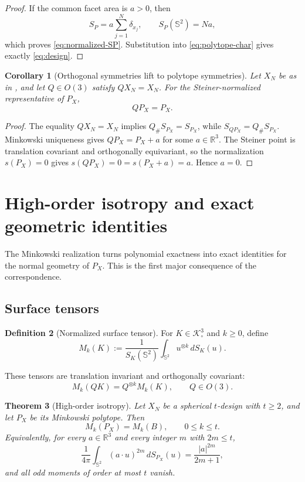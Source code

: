 \documentclass[11pt]{article}
\newtheorem{theorem}{Theorem}[section]
\newtheorem{corollary}[theorem]{Corollary}
\theoremstyle{definition}
\newtheorem{definition}[theorem]{Definition}
\theoremstyle{remark}
\newcommand{\Sph}{\mathbb S}
\newcommand{\R}{\mathbb R}
\newcommand{\K}{\mathcal K}
\begin{document}
\begin{proof}
If the common facet area is $a>0$, then
\[
S_P=a\sum_{j=1}^N\delta_{x_j},\qquad S_P(\Sph^2)=Na,
\]
which proves \eqref{eq:normalized-SP}. Substitution into \eqref{eq:polytope-char} gives exactly \eqref{eq:design}.
\end{proof}

\begin{corollary}[Orthogonal symmetries lift to polytope symmetries]\label{cor:symmetry}
Let $X_N$ be as in , and let $Q\in O(3)$ satisfy $QX_N=X_N$. For the Steiner-normalized representative of $P_X$,
\[
QP_X=P_X.
\]
\end{corollary}

\begin{proof}
The equality $QX_N=X_N$ implies $Q_\#S_{P_X}=S_{P_X}$, while $S_{QP_X}=Q_\#S_{P_X}$. Minkowski uniqueness gives $QP_X=P_X+a$ for some $a\in\R^3$. The Steiner point is translation covariant and orthogonally equivariant, so the normalization $s(P_X)=0$ gives $s(QP_X)=0=s(P_X+a)=a$. Hence $a=0$.
\end{proof}

\section{High-order isotropy and exact geometric identities}\label{sec:isotropy}

The Minkowski realization turns polynomial exactness into exact identities for the normal geometry of $P_X$. This is the first major consequence of the correspondence.

\subsection{Surface tensors}

\begin{definition}[Normalized surface tensor]\label{def:surface-tensor}
For $K\in\K^3_\circ$ and $k\ge0$, define
\begin{equation}\label{eq:surface-tensor}
M_k(K):=\frac1{S_K(\Sph^2)}\int_{\Sph^2}u^{\otimes k}\,dS_K(u).
\end{equation}
\end{definition}
These tensors are translation invariant and orthogonally covariant:
\[
M_k(QK)=Q^{\otimes k}M_k(K),\qquad Q\in O(3).
\]

\begin{theorem}[High-order isotropy]\label{thm:isotropy}
Let $X_N$ be a spherical $t$-design with $t\ge2$, and let $P_X$ be its Minkowski polytope. Then
\begin{equation}\label{eq:isotropy}
M_k(P_X)=M_k(B),\qquad 0\le k\le t.
\end{equation}
Equivalently, for every $a\in\R^3$ and every integer $m$ with $2m\le t$,
\begin{equation}\label{eq:even-moments}
\frac1{4\pi}\int_{\Sph^2}(a\cdot u)^{2m}\,dS_{P_X}(u)=\frac{|a|^{2m}}{2m+1},
\end{equation}
and all odd moments of order at most $t$ vanish.
\end{theorem}
\end{document}
